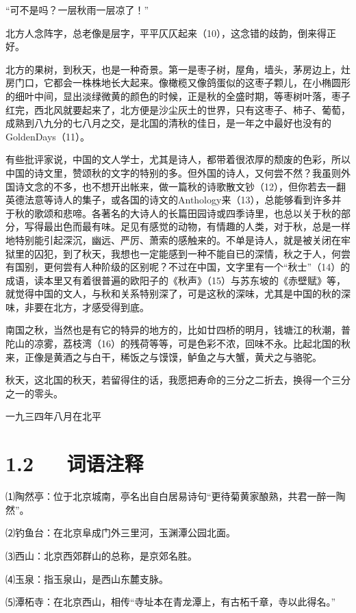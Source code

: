 \documentclass[letterpaper,12pt,english]{sphinxmanual}
\begin{document}
“可不是吗？一层秋雨一层凉了！”

北方人念阵字，总老像是层字，平平仄仄起来（10），这念错的歧韵，倒来得正好。

北方的果树，到秋天，也是一种奇景。第一是枣子树，屋角，墙头，茅房边上，灶房门口，它都会一株株地长大起来。像橄榄又像鸽蛋似的这枣子颗儿，在小椭圆形的细叶中间，显出淡绿微黄的颜色的时候，正是秋的全盛时期，等枣树叶落，枣子红完，西北风就要起来了，北方便是沙尘灰土的世界，只有这枣子、柿子、葡萄，成熟到八九分的七八月之交，是北国的清秋的佳日，是一年之中最好也没有的GoldenDays（11）。

有些批评家说，中国的文人学士，尤其是诗人，都带着很浓厚的颓废的色彩，所以中国的诗文里，赞颂秋的文字的特别的多。但外国的诗人，又何尝不然？我虽则外国诗文念的不多，也不想开出帐来，做一篇秋的诗歌散文钞（12），但你若去一翻英德法意等诗人的集子，或各国的诗文的Anthology来（13），总能够看到许多并于秋的歌颂和悲啼。各著名的大诗人的长篇田园诗或四季诗里，也总以关于秋的部分，写得最出色而最有味。足见有感觉的动物，有情趣的人类，对于秋，总是一样地特别能引起深沉，幽远、严厉、萧索的感触来的。不单是诗人，就是被关闭在牢狱里的囚犯，到了秋天，我想也一定能感到一种不能自已的深情，秋之于人，何尝有国别，更何尝有人种阶级的区别呢？不过在中国，文字里有一个“秋士”（14）的成语，读本里又有着很普遍的欧阳子的《秋声》（15）与苏东坡的《赤壁赋》等，就觉得中国的文人，与秋和关系特别深了，可是这秋的深味，尤其是中国的秋的深味，非要在北方，才感受得到底。

南国之秋，当然也是有它的特异的地方的，比如廿四桥的明月，钱塘江的秋潮，普陀山的凉雾，荔枝湾（16）的残荷等等，可是色彩不浓，回味不永。比起北国的秋来，正像是黄酒之与白干，稀饭之与馍馍，鲈鱼之与大蟹，黄犬之与骆驼。

秋天，这北国的秋天，若留得住的话，我愿把寿命的三分之二折去，换得一个三分之一的零头。

一九三四年八月在北平


\section{1.2   词语注释}
\label{\detokenize{p01_u6563_u6587/_u90c1_u8fbe_u592b-_u53e4_u90fd_u7684_u79cb:id4}}
⑴陶然亭：位于北京城南，亭名出自白居易诗句“更待菊黄家酿熟，共君一醉一陶然”。

⑵钓鱼台：在北京阜成门外三里河，玉渊潭公园北面。

⑶西山：北京西郊群山的总称，是京郊名胜。

⑷玉泉：指玉泉山，是西山东麓支脉。

⑸潭柘寺：在北京西山，相传“寺址本在青龙潭上，有古柘千章，寺以此得名。”
\end{document}
